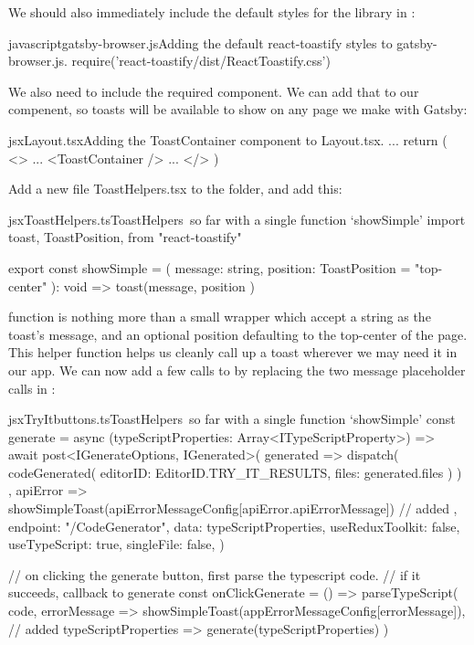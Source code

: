 \documentclass[paper=6in:9in,pagesize=pdftex,headinclude=on,footinclude=on,12pt,twoside]{scrbook}
\begin{document}
We should also immediately include the default styles for the library in :

\begin{codeInput}{javascript}{gatsby-browser.js}{Adding the default react-toastify styles to gatsby-browser.js.}
require('react-toastify/dist/ReactToastify.css')
\end{codeInput}

We also need to include the required  component. We can add that to our  compenent, so toasts will be available to show on any page we make with Gatsby:

\begin{codeInput}{jsx}{Layout.tsx}{Adding the ToastContainer component to Layout.tsx.}
...
return (
  <>
    ...
    <ToastContainer />
    ...
  </>
)
\end{codeInput}

Add a new file {ToastHelpers.tsx} to the  folder, and add this:

\begin{codeInput}{jsx}{ToastHelpers.ts}{ToastHelpers\, so far with a single function `showSimple'}
import {
  toast,
  ToastPosition,
} from "react-toastify"

export const showSimple = (
  message: string,
  position: ToastPosition = "top-center"
): void => {
  toast(message, { position })
}  
\end{codeInput}

 function is nothing more than a small wrapper which accept a string as the toast's message, and an optional position defaulting to the top-center of the page. This helper function helps us cleanly call up a toast wherever we may need it in our app. We can now add a few calls to  by replacing the two message placeholder  calls in :

\begin{codeInput}{jsx}{TryItbuttons.ts}{ToastHelpers\, so far with a single function `showSimple'}
const generate = async (typeScriptProperties: Array<ITypeScriptProperty>) => {
  await post<IGenerateOptions, IGenerated>(
    generated => {
      dispatch(
        codeGenerated({
          editorID: EditorID.TRY_IT_RESULTS,
          files: generated.files
        })
      )
    },
    apiError => {
      showSimpleToast(apiErrorMessageConfig[apiError.apiErrorMessage]) // added
    },
    {
      endpoint: "/CodeGenerator",
      data: {
        typeScriptProperties,
        useReduxToolkit: false,
        useTypeScript: true,
        singleFile: false,
      }
    }
  )
}

// on clicking the generate button, first parse the typescript code.
// if it succeeds, callback to generate
const onClickGenerate = () =>
  parseTypeScript(
    code,
    errorMessage => showSimpleToast(appErrorMessageConfig[errorMessage]), // added
    typeScriptProperties => generate(typeScriptProperties)
  )
\end{codeInput}
\end{document}
